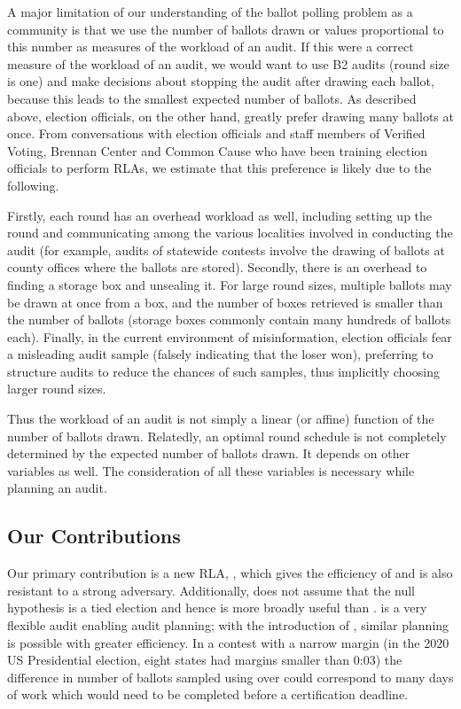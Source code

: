 A major limitation of our understanding of the ballot polling problem as a community is that we use the number of ballots drawn or values proportional to this number \cite{mclaughlin_thesis,bernhard-diss,RI-report} as measures of the workload of an audit. If this were a correct measure of the workload of an audit, we would want to use B2 audits (round size is one) and make decisions about stopping the audit after drawing each ballot, because this leads to the smallest expected number of ballots. As described above, election officials, on the other hand, greatly prefer drawing many ballots at once. From conversations with election officials and staff members of Verified Voting, Brennan Center and Common Cause who have been training election officials to perform RLAs, we estimate that this preference is likely due to the following. 

Firstly, each round has an overhead workload as well, including setting up the round and communicating among the various localities involved in conducting the audit (for example, audits of statewide contests involve the drawing of ballots at county offices where the ballots are stored). Secondly, there is an overhead to finding a storage box and unsealing it. For large round sizes, multiple ballots may be drawn at once from a box, and the number of boxes retrieved is smaller than the number of ballots (storage boxes commonly contain many hundreds of ballots each). 
Finally, in the current environment of misinformation, election officials fear a misleading audit sample (falsely indicating that the loser won), preferring to structure audits to reduce the chances of such samples, thus implicitly choosing larger round sizes. 

Thus the workload of an audit is not simply a linear (or affine) function of the number of ballots drawn. Relatedly, an optimal round schedule is not completely determined by the expected number of ballots drawn. It depends on other variables as well. The consideration of all these variables is necessary while planning an audit. 

\subsection{Our Contributions}
Our primary contribution is a new RLA, \Providence, which gives the efficiency of \Minerva and is also resistant to a strong adversary. Additionally, \Providence does not assume that the null hypothesis is a tied election and hence is more broadly useful than \Minerva. \BRAVO is a very flexible audit enabling audit planning; with the introduction of \Providence, similar planning is possible with greater efficiency. In a contest with a narrow margin (in the 2020 US Presidential election, eight states had margins smaller than 0:03) the difference in number of ballots sampled using \Providence over \BRAVO could correspond to many days of work which would need to be completed before a certification deadline.

